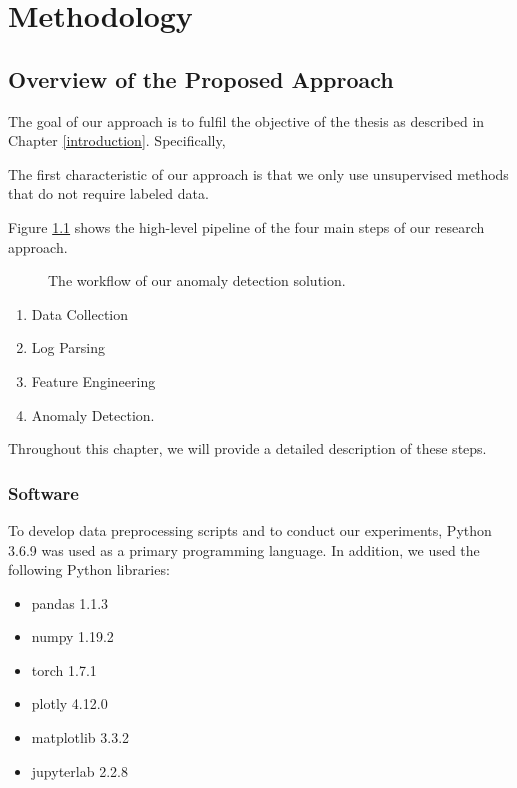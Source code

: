 \chapter{Methodology}
\label{methodology}

\section{Overview of the Proposed Approach}
The goal of our approach is to fulfil the objective of the thesis as described in Chapter \ref{introduction}. Specifically, 

The first characteristic of our approach is that we only use unsupervised methods that do not require labeled data. 

Figure \ref{fig:worklowOverview} shows the high-level pipeline of the four main steps of our research approach.

\begin{figure}[h]
    \centering
    
    \caption{The workflow of our anomaly detection solution.}
    \label{fig:worklowOverview}
\end{figure}

\begin{enumerate}
    \item Data Collection 
    \item Log Parsing
    \item Feature Engineering
    \item Anomaly Detection.
\end{enumerate}

Throughout this chapter, we will provide a detailed description of these steps.

\subsection{Software}
To develop data preprocessing scripts and to conduct our experiments, Python 3.6.9 was used as a primary programming language. In addition, we used the following Python libraries: 

\begin{itemize}
    \item pandas 1.1.3
    \item numpy 1.19.2
    \item torch 1.7.1
    \item plotly 4.12.0
    \item matplotlib 3.3.2
    \item jupyterlab 2.2.8
\end{itemize}


